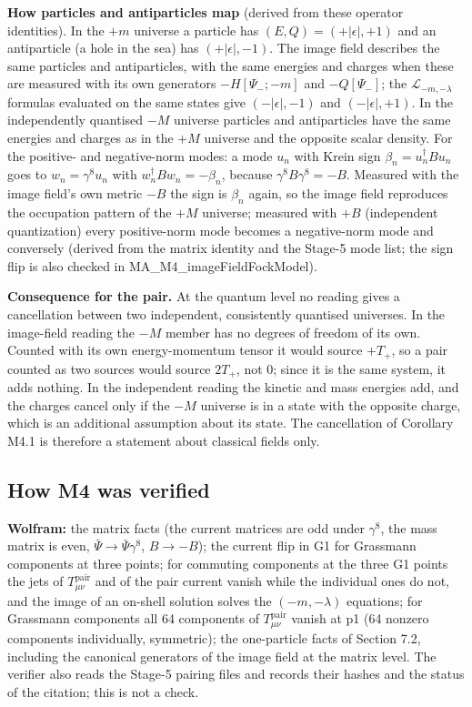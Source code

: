 \documentclass[11pt]{article}
\begin{document}
\textbf{How particles and antiparticles map} (derived from these operator identities). In the $+m$ universe a particle has $(E,Q)=(+|\epsilon|,+1)$ and an antiparticle (a hole in the sea) has $(+|\epsilon|,-1)$. The image field describes the same particles and antiparticles, with the same energies and charges when these are measured with its own generators $-H[\Psi_-;-m]$ and $-Q[\Psi_-]$; the $\mathcal L_{-m,-\lambda}$ formulas evaluated on the same states give $(-|\epsilon|,-1)$ and $(-|\epsilon|,+1)$. In the independently quantised $-M$ universe particles and antiparticles have the same energies and charges as in the $+M$ universe and the opposite scalar density. For the positive- and negative-norm modes: a mode $u_n$ with Krein sign $\beta_n=u_n^\dagger Bu_n$ goes to $w_n=\gamma^8u_n$ with $w_n^\dagger Bw_n=-\beta_n$, because $\gamma^8B\gamma^8=-B$. Measured with the image field's own metric $-B$ the sign is $\beta_n$ again, so the image field reproduces the occupation pattern of the $+M$ universe; measured with $+B$ (independent quantization) every positive-norm mode becomes a negative-norm mode and conversely (derived from the matrix identity and the Stage-5 mode list; the sign flip is also checked in MA\_M4\_imageFieldFockModel).

\textbf{Consequence for the pair.} At the quantum level no reading gives a cancellation between two independent, consistently quantised universes. In the image-field reading the $-M$ member has no degrees of freedom of its own. Counted with its own energy-momentum tensor it would source $+T_+$, so a pair counted as two sources would source $2T_+$, not 0; since it is the same system, it adds nothing. In the independent reading the kinetic and mass energies add, and the charges cancel only if the $-M$ universe is in a state with the opposite charge, which is an additional assumption about its state. The cancellation of Corollary M4.1 is therefore a statement about classical fields only.

\subsection{How M4 was verified}

\textbf{Wolfram:} the matrix facts (the current matrices are odd under $\gamma^8$, the mass matrix is even, $\bar\Psi\to\bar\Psi\gamma^8$, $B\to-B$); the current flip in G1 for Grassmann components at three points; for commuting components at the three G1 points the jets of $T^{\mathrm{pair}}_{\mu\nu}$ and of the pair current vanish while the individual ones do not, and the image of an on-shell solution solves the $(-m,-\lambda)$ equations; for Grassmann components all 64 components of $T^{\mathrm{pair}}_{\mu\nu}$ vanish at p1 (64 nonzero components individually, symmetric); the one-particle facts of Section 7.2, including the canonical generators of the image field at the matrix level. The verifier also reads the Stage-5 pairing files and records their hashes and the status of the citation; this is not a check.
\end{document}
